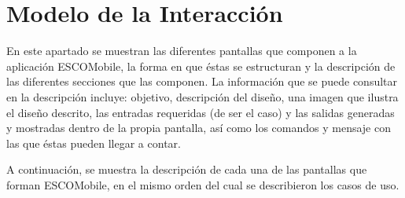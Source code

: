 \documentclass[oneside,10pt]{book}
\begin{document}



\chapter{Modelo de la Interacción}

\noindent
En este apartado se muestran las diferentes pantallas que componen a la aplicación ESCOMobile,
la forma en que éstas se estructuran y la descripción de las diferentes secciones que las componen.
La información que se puede consultar en la descripción incluye: objetivo, descripción del diseño, 
una imagen que ilustra el diseño descrito, las entradas requeridas (de ser el caso) y las salidas
generadas y mostradas dentro de la propia pantalla, así como los comandos y mensaje con las que
éstas pueden llegar a contar.

\noindent
\newline
A continuación, se muestra la descripción de cada una de las pantallas que forman ESCOMobile,
en el mismo orden del cual se describieron los casos de uso.




\end{document}
